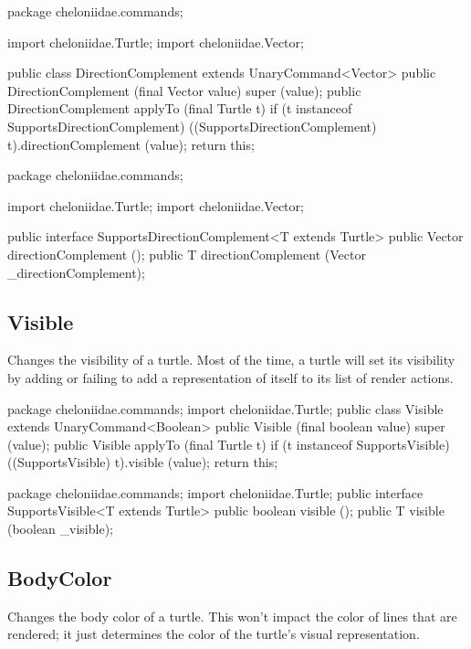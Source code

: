 \documentclass{report}
\begin{document}
\begin{javacode}
package cheloniidae.commands;

import cheloniidae.Turtle;
import cheloniidae.Vector;

public class DirectionComplement extends UnaryCommand<Vector> {
  public DirectionComplement (final Vector value) {super (value);}
  public DirectionComplement applyTo (final Turtle t) {
    if (t instanceof SupportsDirectionComplement) ((SupportsDirectionComplement) t).directionComplement (value);
    return this;
  }
}
\end{javacode}

\begin{javacode}
package cheloniidae.commands;

import cheloniidae.Turtle;
import cheloniidae.Vector;

public interface SupportsDirectionComplement<T extends Turtle> {
  public Vector directionComplement ();
  public T      directionComplement (Vector _directionComplement);
}
\end{javacode}

\subsection {Visible} \label{sec:visible}
        Changes the visibility of a turtle. Most of the time, a turtle will set its visibility by adding or failing to add a representation of itself to its
        list of render actions.

\begin{javacode}
package cheloniidae.commands;
import cheloniidae.Turtle;
public class Visible extends UnaryCommand<Boolean> {
  public Visible (final boolean value) {super (value);}
  public Visible applyTo (final Turtle t) {
    if (t instanceof SupportsVisible) ((SupportsVisible) t).visible (value);
    return this;
  }
}
\end{javacode}

\begin{javacode}
package cheloniidae.commands;
import cheloniidae.Turtle;
public interface SupportsVisible<T extends Turtle> {
  public boolean visible ();
  public T       visible (boolean _visible);
}
\end{javacode}

\subsection {BodyColor} \label{sec:bodycolor}
        Changes the body color of a turtle. This won't impact the color of lines that are rendered; it just determines the color of the turtle's visual
        representation.
\end{document}
